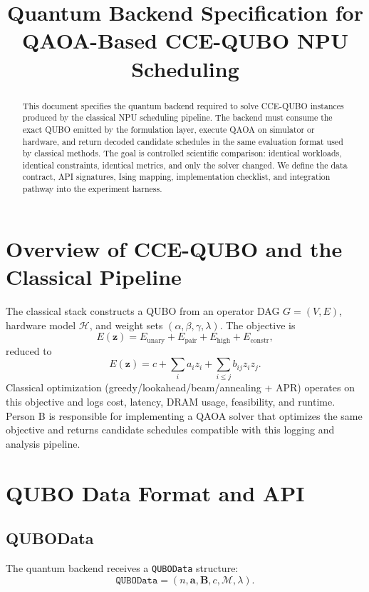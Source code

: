 \documentclass{article}
\title{Quantum Backend Specification for QAOA-Based CCE-QUBO NPU Scheduling}
\author{}
\date{}
\begin{document}
\maketitle

\begin{abstract}
This document specifies the quantum backend required to solve CCE-QUBO instances produced by the classical NPU scheduling pipeline. The backend must consume the exact QUBO emitted by the formulation layer, execute QAOA on simulator or hardware, and return decoded candidate schedules in the same evaluation format used by classical methods. The goal is controlled scientific comparison: identical workloads, identical constraints, identical metrics, and only the solver changed. We define the data contract, API signatures, Ising mapping, implementation checklist, and integration pathway into the experiment harness.
\end{abstract}

\section{Overview of CCE-QUBO and the Classical Pipeline}
The classical stack constructs a QUBO from an operator DAG $G=(V,E)$, hardware model $\mathcal{H}$, and weight sets $(\alpha,\beta,\gamma,\lambda)$. The objective is
\begin{equation}
E(\mathbf{z}) = E_{\text{unary}} + E_{\text{pair}} + E_{\text{high}} + E_{\text{constr}},
\end{equation}
reduced to
\begin{equation}
E(\mathbf{z}) = c + \sum_i a_i z_i + \sum_{i\le j} b_{ij} z_i z_j.
\end{equation}
Classical optimization (greedy/lookahead/beam/annealing + APR) operates on this objective and logs cost, latency, DRAM usage, feasibility, and runtime. Person B is responsible for implementing a QAOA solver that optimizes the same objective and returns candidate schedules compatible with this logging and analysis pipeline.

\section{QUBO Data Format and API}
\subsection{QUBOData}
The quantum backend receives a \texttt{QUBOData} structure:
\begin{equation}
\texttt{QUBOData} = (n,\mathbf{a},\mathbf{B},c,\mathcal{M},\lambda).
\end{equation}
\end{document}
